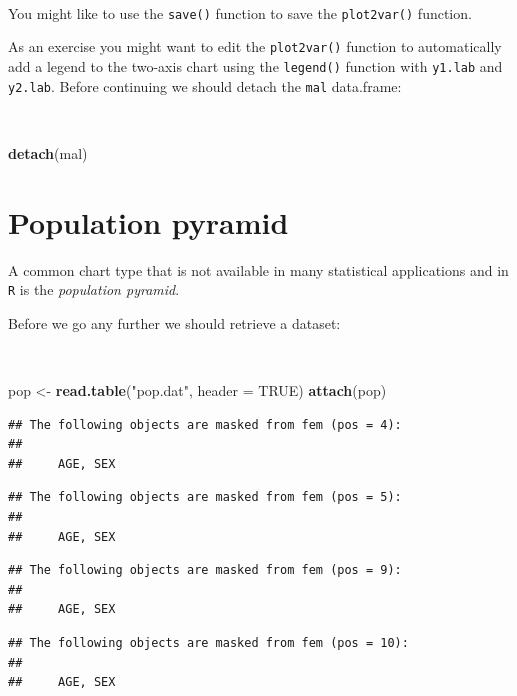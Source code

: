 \documentclass[12pt,a4paper]{book}
\newenvironment{Shaded}{\begin{snugshade}}{\end{snugshade}}
\newcommand{\DataTypeTok}[1]{\textcolor[rgb]{0.13,0.29,0.53}{#1}}
\newcommand{\KeywordTok}[1]{\textcolor[rgb]{0.13,0.29,0.53}{\textbf{#1}}}
\newcommand{\NormalTok}[1]{#1}
\newcommand{\OtherTok}[1]{\textcolor[rgb]{0.56,0.35,0.01}{#1}}
\newcommand{\StringTok}[1]{\textcolor[rgb]{0.31,0.60,0.02}{#1}}
\theoremstyle{definition}
\theoremstyle{definition}
\theoremstyle{definition}
\theoremstyle{remark}
\begin{document}
~

You might like to use the \texttt{save()} function to save the
\texttt{plot2var()} function.

As an exercise you might want to edit the \texttt{plot2var()} function
to automatically add a legend to the two-axis chart using the
\texttt{legend()} function with \texttt{y1.lab} and \texttt{y2.lab}.
Before continuing we should detach the \texttt{mal} data.frame:

~

\begin{Shaded}
\begin{Highlighting}[]
\KeywordTok{detach}\NormalTok{(mal)}
\end{Highlighting}
\end{Shaded}

\hypertarget{population-pyramid}{%
\section{Population pyramid}\label{population-pyramid}}

A common chart type that is not available in many statistical
applications and in \texttt{R} is the \emph{population pyramid}.

Before we go any further we should retrieve a dataset:

~

\begin{Shaded}
\begin{Highlighting}[]
\NormalTok{pop <-}\StringTok{ }\KeywordTok{read.table}\NormalTok{(}\StringTok{"pop.dat"}\NormalTok{, }\DataTypeTok{header =} \OtherTok{TRUE}\NormalTok{)}
\KeywordTok{attach}\NormalTok{(pop)}
\end{Highlighting}
\end{Shaded}

\begin{verbatim}
## The following objects are masked from fem (pos = 4):
## 
##     AGE, SEX
\end{verbatim}

\begin{verbatim}
## The following objects are masked from fem (pos = 5):
## 
##     AGE, SEX
\end{verbatim}

\begin{verbatim}
## The following objects are masked from fem (pos = 9):
## 
##     AGE, SEX
\end{verbatim}

\begin{verbatim}
## The following objects are masked from fem (pos = 10):
## 
##     AGE, SEX
\end{verbatim}
\end{document}
